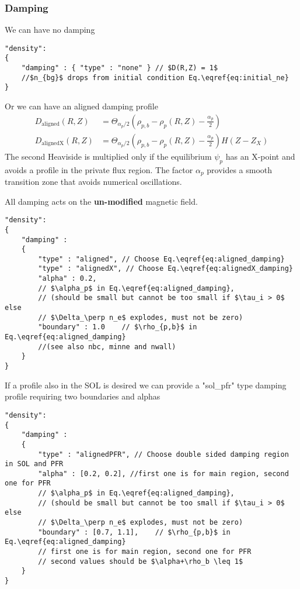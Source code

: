 \subsubsection{Damping} \label{sec:damping}
We can have no damping
\begin{verbatim}
"density":
{
    "damping" : { "type" : "none" } // $D(R,Z) = 1$
    //$n_{bg}$ drops from initial condition Eq.\eqref{eq:initial_ne}
}
\end{verbatim}
Or we can have an aligned damping profile
\begin{align}
    \label{eq:aligned_damping}
    D_\mathrm{aligned}(R,Z)&=\Theta_{\alpha_p/2}\left(\rho_{p,b}-\rho_p(R, Z)-\frac{\alpha_p}{2}\right)\\
    \label{eq:alignedX_damping}
    D_\mathrm{alignedX}(R,Z)&=\Theta_{\alpha_p/2}\left(\rho_{p,b}-\rho_p(R, Z)-\frac{\alpha_p}{2}\right) H(Z-Z_X)
\end{align}
The second Heaviside is multiplied only if the equilibrium $\psi_p$ has an
X-point and avoids a profile in the private flux region.
The factor $\alpha_p$ provides a smooth transition
zone that avoids numerical oscillations.
\begin{tcolorbox}[title=Note]
    All damping acts on the \textbf{un-modified} magnetic field.
\end{tcolorbox}
\begin{verbatim}
"density":
{
    "damping" :
    {
        "type" : "aligned", // Choose Eq.\eqref{eq:aligned_damping}
        "type" : "alignedX", // Choose Eq.\eqref{eq:alignedX_damping}
        "alpha" : 0.2,
        // $\alpha_p$ in Eq.\eqref{eq:aligned_damping},
        // (should be small but cannot be too small if $\tau_i > 0$ else
        // $\Delta_\perp n_e$ explodes, must not be zero)
        "boundary" : 1.0    // $\rho_{p,b}$ in Eq.\eqref{eq:aligned_damping}
        //(see also nbc, minne and nwall)
    }
}
\end{verbatim}
If a profile also in the SOL is desired we can provide a "sol\_pfr" type damping
profile requiring two boundaries and alphas
\begin{verbatim}
"density":
{
    "damping" :
    {
        "type" : "alignedPFR", // Choose double sided damping region in SOL and PFR
        "alpha" : [0.2, 0.2], //first one is for main region, second one for PFR
        // $\alpha_p$ in Eq.\eqref{eq:aligned_damping},
        // (should be small but cannot be too small if $\tau_i > 0$ else
        // $\Delta_\perp n_e$ explodes, must not be zero)
        "boundary" : [0.7, 1.1],    // $\rho_{p,b}$ in Eq.\eqref{eq:aligned_damping}
        // first one is for main region, second one for PFR
        // second values should be $\alpha+\rho_b \leq 1$
    }
}
\end{verbatim}
